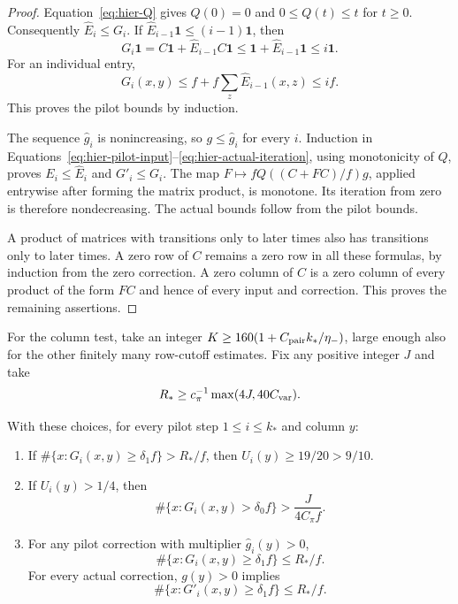 \begin{proof}
Equation~\eqref{eq:hier-Q} gives $Q(0)=0$ and
$0\leq Q(t)\leq t$ for $t\ge0$.
Consequently $\widehat E_i\leq G_i$.  If
$\widehat E_{i-1}\mathbf 1\leq(i-1)\mathbf 1$, then
\[
 G_i\mathbf 1=C\mathbf 1+\widehat E_{i-1}C\mathbf 1
       \leq\mathbf 1+\widehat E_{i-1}\mathbf 1
       \leq i\mathbf 1.
\]
For an individual entry,
\[
 G_i(x,y)\leq f+f\sum_z\widehat E_{i-1}(x,z)\leq if.
\]
This proves the pilot bounds by induction.

The sequence $\widehat g_i$ is nonincreasing, so
$g\leq\widehat g_i$ for every $i$.  Induction in
Equations~\eqref{eq:hier-pilot-input}--\eqref{eq:hier-actual-iteration},
using monotonicity of $Q$, proves $E_i\leq\widehat E_i$ and
$G'_i\leq G_i$.  The map
$F\mapsto fQ((C+FC)/f)g$, applied entrywise after forming the matrix
product, is monotone.  Its iteration from zero is therefore
nondecreasing.  The actual bounds follow from the pilot bounds.

A product of matrices with transitions only to later times also has transitions only to later times.  A zero row
of $C$ remains a zero row in all these formulas, by induction from the
zero correction.  A zero column of $C$ is a zero column of every product
of the form $FC$ and hence of every input and correction.  This proves
the remaining assertions.
\end{proof}

For the column test, take an integer
$K\geq160(1+C_{\rm pair}k_*/\eta_-)$, large enough also for the other
finitely many row-cutoff estimates. Fix any positive integer $J$ and take
\begin{equation}
 R_*\geq c_\pi^{-1}\max(4J,40C_{\rm var}).
 \label{eq:hier-column-constants}
\end{equation}

\begin{lemma}
\label{lem:hier-column-test}
With these choices, for every pilot step $1\le i\le k_*$ and column $y$:
\begin{enumerate}
\item If
$\#\{x:G_i(x,y)\geq\delta_1f\}>R_*/f$, then
$U_i(y)\geq19/20>9/10$.
\item If $U_i(y)>1/4$, then
\[
 \#\{x:G_i(x,y)>\delta_0f\}
       >\frac{J}{4C_\pi f}.
\]
\item For any pilot correction with multiplier
$\widehat g_i(y)>0$,
\[
 \#\{x:G_i(x,y)\geq\delta_1f\}\leq R_*/f.
\]
For every actual correction, $g(y)>0$ implies
\[
 \#\{x:G'_i(x,y)\geq\delta_1f\}\leq R_*/f.
\]
\end{enumerate}
\end{lemma}

